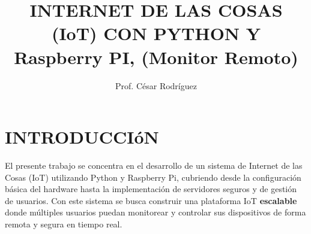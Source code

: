\documentclass{report}
\title{INTERNET DE LAS COSAS (IoT) CON PYTHON Y Raspberry PI, (Monitor Remoto)}
\author{Prof. César Rodríguez}
\date{}
\begin{document}
\maketitle
\tableofcontents

\chapter{INTRODUCCIóN}
El presente trabajo se concentra en el desarrollo de un sistema de Internet de las Cosas (IoT) utilizando 
Python y Raspberry Pi, cubriendo desde la configuración básica del hardware hasta la implementación de servidores seguros y 
de gestión de usuarios. Con este sistema se busca construir una plataforma IoT \textbf{escalable} donde múltiples usuarios puedan 
monitorear y controlar sus dispositivos de forma remota y segura en tiempo real.
\end{document}

